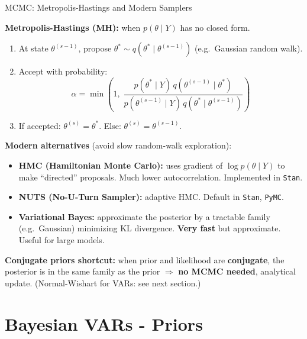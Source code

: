 \documentclass{beamer}
\begin{document}
\begin{frame}{MCMC: Metropolis-Hastings and Modern Samplers}
\footnotesize

\textbf{Metropolis-Hastings (MH):} when $p(\theta \mid Y)$ has no closed form.
\begin{enumerate}
  \item At state $\theta^{(s-1)}$, propose $\theta^* \sim q(\theta^* \mid \theta^{(s-1)})$ (e.g.\ Gaussian random walk).
  \item Accept with probability:
  \[
    \alpha = \min\!\left(1,\; \frac{p(\theta^* \mid Y)\, q(\theta^{(s-1)} \mid \theta^*)}{p(\theta^{(s-1)} \mid Y)\, q(\theta^* \mid \theta^{(s-1)})}\right)
  \]
  \item If accepted: $\theta^{(s)} = \theta^*$. Else: $\theta^{(s)} = \theta^{(s-1)}$.
\end{enumerate}

\medskip
\textbf{Modern alternatives} (avoid slow random-walk exploration):
\begin{itemize}
  \item \textbf{HMC (Hamiltonian Monte Carlo):} uses gradient of $\log p(\theta \mid Y)$ to make
        ``directed'' proposals. Much lower autocorrelation. Implemented in \texttt{Stan}.
  \item \textbf{NUTS (No-U-Turn Sampler):} adaptive HMC. Default in \texttt{Stan}, \texttt{PyMC}.
  \item \textbf{Variational Bayes:} approximate the posterior by a tractable family (e.g.\ Gaussian)
        minimizing KL divergence. \textbf{Very fast} but approximate. Useful for large models.
\end{itemize}

\medskip
\textbf{Conjugate priors shortcut:} when prior and likelihood are \textbf{conjugate}, the posterior is in
the same family as the prior $\Rightarrow$ \textbf{no MCMC needed}, analytical update.
(Normal-Wishart for VARs: see next section.)

\end{frame}


\section{Bayesian VARs - Priors}
\end{document}
